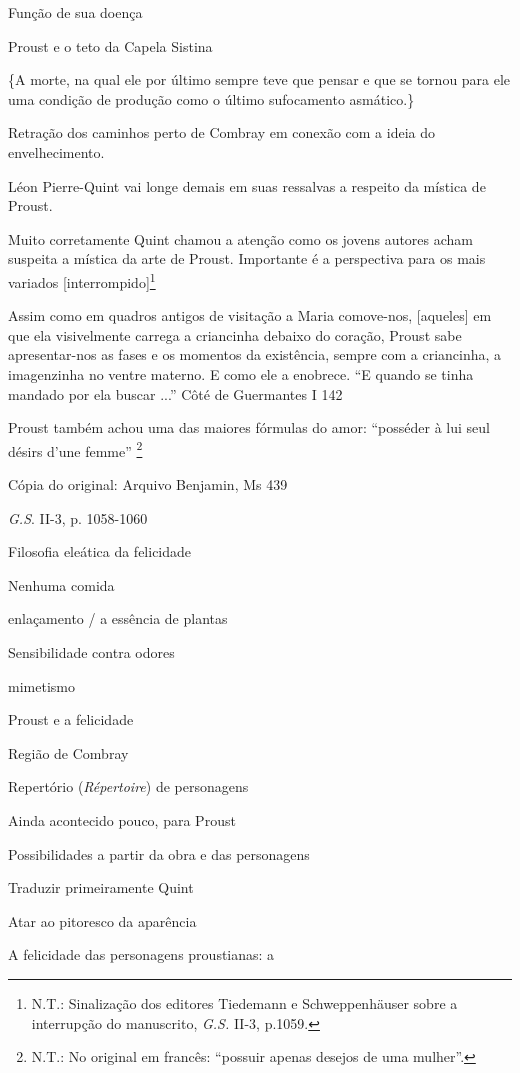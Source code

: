Função de sua doença

Proust e o teto da Capela Sistina

\{A morte, na qual ele por último sempre teve que pensar e que se tornou
para ele uma condição de produção como o último sufocamento asmático.\}

Retração dos caminhos perto de Combray em conexão com a ideia do
envelhecimento.

Léon Pierre-Quint vai longe demais em suas ressalvas a respeito da
mística de Proust.

Muito corretamente Quint chamou a atenção como os jovens autores acham
suspeita a mística da arte de Proust. Importante é a perspectiva para os
mais variados {[}interrompido{]}\footnote{N.T.: Sinalização dos editores
  Tiedemann e Schweppenhäuser sobre a interrupção do manuscrito,
  \emph{G.S.} II-3, p.1059.}

Assim como em quadros antigos de visitação a Maria comove-nos,
{[}aqueles{]} em que ela visivelmente carrega a criancinha debaixo do
coração, Proust sabe apresentar-nos as fases e os momentos da
existência, sempre com a criancinha, a imagenzinha no ventre materno. E
como ele a enobrece. ``E quando se tinha mandado por ela buscar ...''
Côté de Guermantes I 142

Proust também achou uma das maiores fórmulas do amor: ``posséder à lui
seul désirs d'une femme'' \footnote{N.T.: No original em francês:
  ``possuir apenas desejos de uma mulher''.}

Cópia do original: Arquivo Benjamin, Ms 439

\emph{G.S}. II-3, p. 1058-1060

Filosofia eleática da felicidade

Nenhuma comida

enlaçamento / a essência de plantas

Sensibilidade contra odores

mimetismo

Proust e a felicidade

Região de Combray

Repertório (\emph{Répertoire}) de personagens

Ainda acontecido pouco, para Proust

Possibilidades a partir da obra e das personagens

Traduzir primeiramente Quint

Atar ao pitoresco da aparência

A felicidade das personagens proustianas: a

